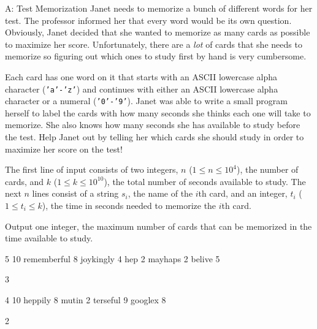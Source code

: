 \begin{problem}{A: Test Memorization}
Janet needs to memorize a bunch of different words for her test.
The professor informed her that every word would be its own question.
Obviously, Janet decided that she wanted to memorize as many cards as possible to maximize her score.
Unfortunately, there are a \textit{lot} of cards that she needs to memorize so figuring out which ones to study first by hand is very cumbersome.

Each card has one word on it that starts with an ASCII lowercase alpha character (\texttt{'a'-'z'}) and continues with either an ASCII lowercase alpha character or a numeral (\texttt{'0'-'9'}).
Janet was able to write a small program herself to label the cards with how many seconds she thinks each one will take to memorize.
She also knows how many seconds she has available to study before the test.
Help Janet out by telling her which cards she should study in order to maximize her score on the test!
\end{problem}

\begin{formalin}
The first line of input consists of two integers, $n$ ($1 \leq n \leq 10^4$), the number of cards, and $k$ ($1 \leq k \leq 10^{10}$), the total number of seconds available to study. 
The next $n$ lines consist of a string $s_i$, the name of the $i$th card, and an integer, $t_i$ ($1 \leq t_i \leq k$), the time in seconds needed to memorize the $i$th card.
\end{formalin}

\begin{formalout}
Output one integer, the maximum number of cards that can be memorized in the time available to study.
\end{formalout}

\begin{datain}
5 10
rememberful 8
joykingly 4
hep 2
mayhaps 2
belive 5
\end{datain}
\begin{dataout}
3
\end{dataout}

\begin{datain}
4 10
heppily 8
mutin 2
terseful 9
googlex 8
\end{datain}
\begin{dataout}
2
\end{dataout}
